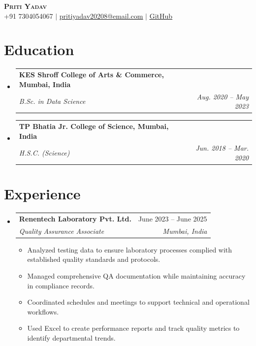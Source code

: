 \documentclass[letterpaper,11pt]{article}
\makeatletter
\newcommand{\resumeItem}[1]{
  \item\small{{#1 \vspace{-2pt}}}
}
\newcommand{\resumeSubheading}[4]{
  \vspace{-2pt}\item
    \begin{tabular*}{0.97\textwidth}[t]{l@{\extracolsep{\fill}}r}
      \textbf{#1} & #2 \\
      \textit{\small#3} & \textit{\small #4} \\
    \end{tabular*}\vspace{-7pt}
}
\newcommand{\resumeSubHeadingListStart}{\begin{itemize}[leftmargin=0.15in, label={}]}
\newcommand{\resumeSubHeadingListEnd}{\end{itemize}}
\newcommand{\resumeItemListStart}{\begin{itemize}}
\newcommand{\resumeItemListEnd}{\end{itemize}\vspace{-5pt}}
\makeatother
\begin{document}
\begin{center}
    \textbf{\Huge \scshape Priti Yadav} \\ \vspace{1pt}
    \small +91 7304054067 $|$
    \href{mailto:spritiyadav20208@email.com}{\underline{pritiyadav20208@email.com}} $|$
    \href{https://github.com/pretty-yadav}{\underline{GitHub}}
\end{center}


\section{Education}
  \resumeSubHeadingListStart

    \resumeSubheading
        {KES Shroff College of Arts \& Commerce, Mumbai, India}{}
        {B.Sc. in Data Science}{Aug. 2020 -- May 2023}

    \resumeSubheading
        {TP Bhatia Jr. College of Science, Mumbai, India}{}
        {H.S.C. (Science)}{Jun. 2018 -- Mar. 2020}

  \resumeSubHeadingListEnd

\section{Experience}
\resumeSubHeadingListStart

\resumeSubheading
{Renentech Laboratory Pvt. Ltd.}{June 2023 -- June 2025}
{Quality Assurance Associate}{Mumbai, India}

\resumeItemListStart
\resumeItem{Analyzed testing data to ensure laboratory processes complied with established quality standards and protocols.}
\resumeItem{Managed comprehensive QA documentation while maintaining accuracy in compliance records.}
\resumeItem{Coordinated schedules and meetings to support technical and operational workflows.}
\resumeItem{Used Excel to create performance reports and track quality metrics to identify departmental trends.}
\resumeItemListEnd

\resumeSubHeadingListEnd

\end{document}
